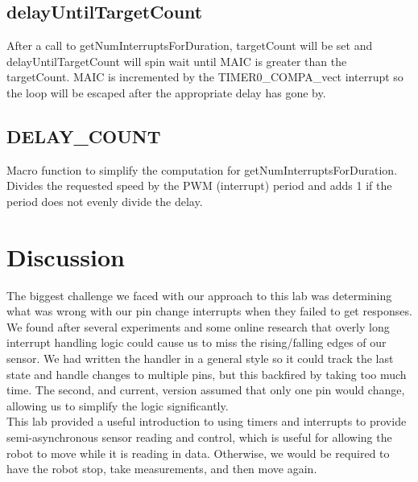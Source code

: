 \documentclass[letterpaper,11pt]{texMemo} %
\begin{document}
\subsection*{delayUntilTargetCount}
After a call to getNumInterruptsForDuration, targetCount will be set and delayUntilTargetCount will spin wait until MAIC is greater than the targetCount. MAIC is incremented by the TIMER0\_COMPA\_vect interrupt so the loop will be escaped after the appropriate delay has gone by.

\subsection*{DELAY\_COUNT}
Macro function to simplify the computation for getNumInterruptsForDuration. Divides the requested speed by the PWM (interrupt) period and adds 1 if the period does not evenly divide the delay.

\section*{Discussion}
The biggest challenge we faced with our approach to this lab was determining what was wrong with our pin change interrupts when they failed to get responses. We found after several experiments and some online research that overly long interrupt handling logic could cause us to miss the rising/falling edges of our sensor. We had written the handler in a general style so it could track the last state and handle changes to multiple pins, but this backfired by taking too much time. The second, and current, version assumed that only one pin would change, allowing us to simplify the logic significantly.\\

This lab provided a useful introduction to using timers and interrupts to provide semi-asynchronous sensor reading and control, which is useful for allowing the robot to move while it is reading in data. Otherwise, we would be required to have the robot stop, take measurements, and then move again.
\end{document}
